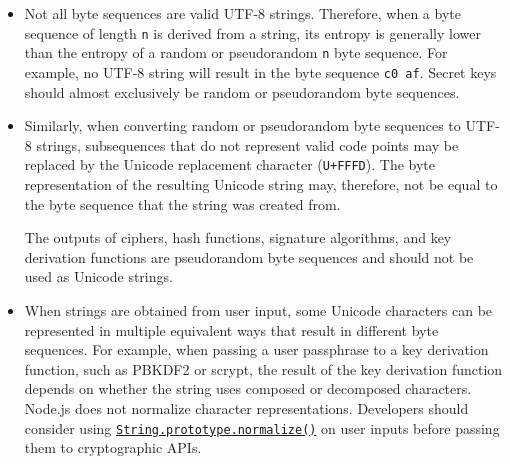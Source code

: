 \begin{itemize}
\item
  Not all byte sequences are valid UTF-8 strings. Therefore, when a byte
  sequence of length \texttt{n} is derived from a string, its entropy is
  generally lower than the entropy of a random or pseudorandom
  \texttt{n} byte sequence. For example, no UTF-8 string will result in
  the byte sequence \texttt{c0\ af}. Secret keys should almost
  exclusively be random or pseudorandom byte sequences.
\item
  Similarly, when converting random or pseudorandom byte sequences to
  UTF-8 strings, subsequences that do not represent valid code points
  may be replaced by the Unicode replacement character
  (\texttt{U+FFFD}). The byte representation of the resulting Unicode
  string may, therefore, not be equal to the byte sequence that the
  string was created from.

\begin{Shaded}
\begin{Highlighting}[]
\OperatorTok{=}\NormalTok{ [}\OperatorTok{,} \NormalTok{]}\OperatorTok{;}
\OperatorTok{=} \NormalTok{(}\NormalTok{)}\OperatorTok{;}
\OperatorTok{=} \OperatorTok{,} \NormalTok{)}\OperatorTok{;}
\OperatorTok{;}
\end{Highlighting}
\end{Shaded}

  The outputs of ciphers, hash functions, signature algorithms, and key
  derivation functions are pseudorandom byte sequences and should not be
  used as Unicode strings.
\item
  When strings are obtained from user input, some Unicode characters can
  be represented in multiple equivalent ways that result in different
  byte sequences. For example, when passing a user passphrase to a key
  derivation function, such as PBKDF2 or scrypt, the result of the key
  derivation function depends on whether the string uses composed or
  decomposed characters. Node.js does not normalize character
  representations. Developers should consider using
  \href{https://developer.mozilla.org/en-US/docs/Web/JavaScript/Reference/Global_Objects/String/normalize}{\texttt{String.prototype.normalize()}}
  on user inputs before passing them to cryptographic APIs.
\end{itemize}

